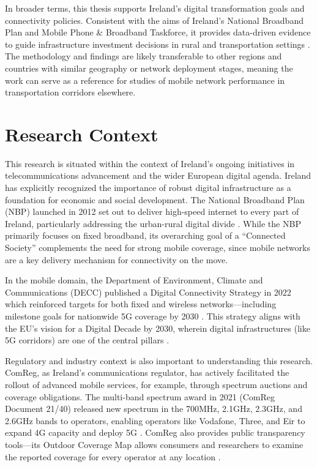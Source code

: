 \documentclass[MScCS]{uccthesis}
\begin{document}
In broader terms, this thesis supports Ireland's digital transformation goals and connectivity policies. Consistent with the aims of Ireland's National Broadband Plan and Mobile Phone \& Broadband Taskforce, it provides data-driven evidence to guide infrastructure investment decisions in rural and transportation settings \cite{dcenr2012nbp}. The methodology and findings are likely transferable to other regions and countries with similar geography or network deployment stages, meaning the work can serve as a reference for studies of mobile network performance in transportation corridors elsewhere.

\section{Research Context}

This research is situated within the context of Ireland's ongoing initiatives in telecommunications advancement and the wider European digital agenda. Ireland has explicitly recognized the importance of robust digital infrastructure as a foundation for economic and social development. The National Broadband Plan (NBP) launched in 2012 set out to deliver high-speed internet to every part of Ireland, particularly addressing the urban-rural digital divide \cite{dcenr2012nbp}. While the NBP primarily focuses on fixed broadband, its overarching goal of a ``Connected Society'' complements the need for strong mobile coverage, since mobile networks are a key delivery mechanism for connectivity on the move.

In the mobile domain, the Department of Environment, Climate and Communications (DECC) published a Digital Connectivity Strategy in 2022 which reinforced targets for both fixed and wireless networks---including milestone goals for nationwide 5G coverage by 2030 \cite{decc2022_strategy}. This strategy aligns with the EU's vision for a Digital Decade by 2030, wherein digital infrastructures (like 5G corridors) are one of the central pillars \cite{eu2016_action_plan}.

Regulatory and industry context is also important to understanding this research. ComReg, as Ireland's communications regulator, has actively facilitated the rollout of advanced mobile services, for example, through spectrum auctions and coverage obligations. The multi-band spectrum award in 2021 (ComReg Document 21/40) released new spectrum in the 700MHz, 2.1GHz, 2.3GHz, and 2.6GHz bands to operators, enabling operators like Vodafone, Three, and Eir to expand 4G capacity and deploy 5G \cite{comreg2140_IM}. ComReg also provides public transparency tools---its Outdoor Coverage Map allows consumers and researchers to examine the reported coverage for every operator at any location \cite{comreg2022coveragemap}.
\end{document}
